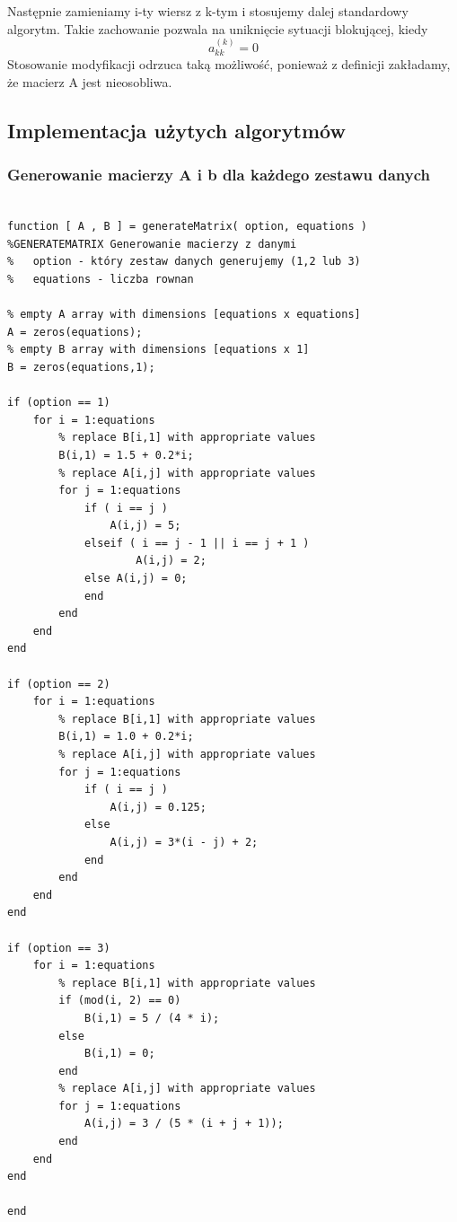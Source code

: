 \documentclass[11pt]{article} %
\begin{document}
Następnie zamieniamy i-ty wiersz z k-tym i stosujemy dalej standardowy algorytm.
Takie zachowanie pozwala na uniknięcie sytuacji blokującej, kiedy 
\begin{equation}
a_{kk}^{(k)} = 0 
\end{equation}
Stosowanie modyfikacji odrzuca taką możliwość, ponieważ z definicji zakładamy, że macierz A jest nieosobliwa.

\subsection{Implementacja użytych algorytmów}

\subsubsection{Generowanie macierzy A i b dla każdego zestawu danych}

\begin{verbatim}

function [ A , B ] = generateMatrix( option, equations )
%GENERATEMATRIX Generowanie macierzy z danymi
%   option - który zestaw danych generujemy (1,2 lub 3)
%   equations - liczba rownan

% empty A array with dimensions [equations x equations]
A = zeros(equations);
% empty B array with dimensions [equations x 1]
B = zeros(equations,1);

if (option == 1)
    for i = 1:equations
        % replace B[i,1] with appropriate values
        B(i,1) = 1.5 + 0.2*i;
        % replace A[i,j] with appropriate values
        for j = 1:equations
            if ( i == j ) 
                A(i,j) = 5;
            elseif ( i == j - 1 || i == j + 1 ) 
                    A(i,j) = 2;
            else A(i,j) = 0;
            end
        end
    end
end

if (option == 2)
    for i = 1:equations
        % replace B[i,1] with appropriate values
        B(i,1) = 1.0 + 0.2*i;
        % replace A[i,j] with appropriate values
        for j = 1:equations
            if ( i == j )  
                A(i,j) = 0.125;
            else
                A(i,j) = 3*(i - j) + 2;
            end
        end
    end
end

if (option == 3)
    for i = 1:equations
        % replace B[i,1] with appropriate values
        if (mod(i, 2) == 0)
            B(i,1) = 5 / (4 * i);
        else
            B(i,1) = 0;
        end
        % replace A[i,j] with appropriate values
        for j = 1:equations
            A(i,j) = 3 / (5 * (i + j + 1));
        end
    end
end
    
end

\end{verbatim}
\end{document}
